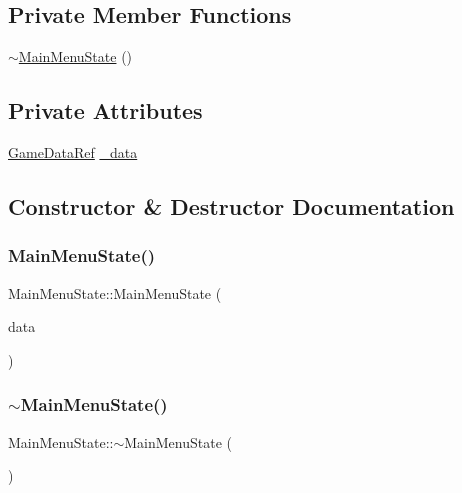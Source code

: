 \subsection*{Private Member Functions}
\begin{DoxyCompactItemize}
\item 
\hyperlink{classMainMenuState_a8af4d586b93c315a1a15b5fe83ec0760}{$\sim$\+Main\+Menu\+State} ()
\end{DoxyCompactItemize}
\subsection*{Private Attributes}
\begin{DoxyCompactItemize}
\item 
\hyperlink{game_8h_a513c9dd465a0df41dbb4daf40cc717c2}{Game\+Data\+Ref} \hyperlink{classMainMenuState_aa92b097f34007a1fc8223aa43062af46}{\+\_\+data}
\end{DoxyCompactItemize}


\subsection{Constructor \& Destructor Documentation}
\mbox{\label{classMainMenuState_a8bf084041900c86967b51354fb26a230}} 
\subsubsection{\texorpdfstring{Main\+Menu\+State()}{MainMenuState()}}
{\footnotesize\ttfamily Main\+Menu\+State\+::\+Main\+Menu\+State (\begin{DoxyParamCaption}\item[{\hyperlink{game_8h_a513c9dd465a0df41dbb4daf40cc717c2}{Game\+Data\+Ref}}]{data }\end{DoxyParamCaption})}

\mbox{\label{classMainMenuState_a8af4d586b93c315a1a15b5fe83ec0760}} 
\subsubsection{\texorpdfstring{$\sim$\+Main\+Menu\+State()}{~MainMenuState()}}
{\footnotesize\ttfamily Main\+Menu\+State\+::$\sim$\+Main\+Menu\+State (\begin{DoxyParamCaption}{ }\end{DoxyParamCaption})\hspace{0.3cm}{\ttfamily [private]}}



